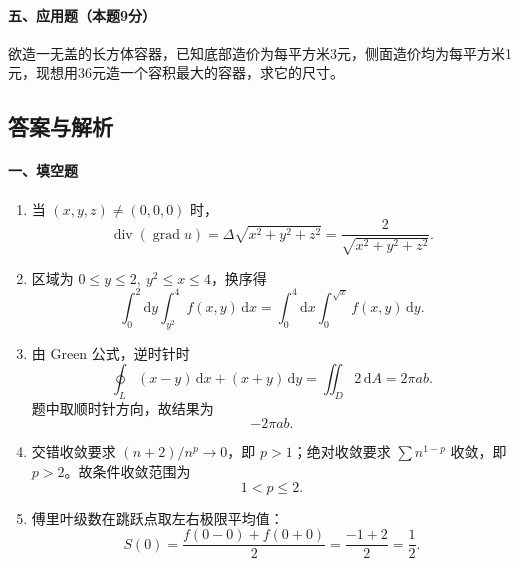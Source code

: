 \paragraph*{五、应用题（本题9分）}
欲造一无盖的长方体容器，已知底部造价为每平方米3元，侧面造价均为每平方米1元，现想用36元造一个容积最大的容器，求它的尺寸。

\subsection{答案与解析}

\paragraph*{一、填空题}
\begin{enumerate}
  \item 当 \((x,y,z)\ne(0,0,0)\) 时，
  \[
    \operatorname{div}(\operatorname{grad}u)=\Delta\sqrt{x^2+y^2+z^2}
    =\frac{2}{\sqrt{x^2+y^2+z^2}}.
  \]
  \item 区域为 \(0\le y\le2,\ y^2\le x\le4\)，换序得
  \[
    \int_0^2\mathrm{d}y\int_{y^2}^{4}f(x,y)\,\mathrm{d}x
    =\int_0^4\mathrm{d}x\int_0^{\sqrt x}f(x,y)\,\mathrm{d}y.
  \]
  \item 由 Green 公式，逆时针时
  \[
    \oint_L(x-y)\,\mathrm{d}x+(x+y)\,\mathrm{d}y
    =\iint_D 2\,\mathrm{d}A=2\pi ab.
  \]
  题中取顺时针方向，故结果为
  \[
    -2\pi ab.
  \]
  \item 交错收敛要求 \((n+2)/n^p\to0\)，即 \(p>1\)；绝对收敛要求 \(\sum n^{1-p}\) 收敛，即 \(p>2\)。故条件收敛范围为
  \[
    1<p\le2.
  \]
  \item 傅里叶级数在跳跃点取左右极限平均值：
  \[
    S(0)=\frac{f(0-0)+f(0+0)}2=\frac{-1+2}{2}=\frac12.
  \]
\end{enumerate}

